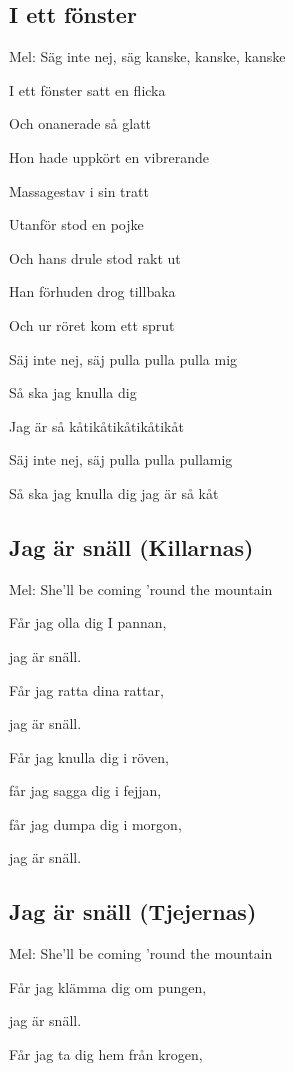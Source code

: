 \subsection{\textbf{I ett fönster}}

Mel: Säg inte nej, säg kanske, kanske, kanske\bigskip


I ett fönster satt en flicka

Och onanerade så glatt

Hon hade uppkört en vibrerande

Massagestav i sin tratt

Utanför stod en pojke

Och hans drule stod rakt ut

Han förhuden drog tillbaka

Och ur röret kom ett sprut

Säj inte nej, säj pulla pulla pulla mig

Så ska jag knulla dig

Jag är så kåtikåtikåtikåtikåt

Säj inte nej, säj pulla pulla pullamig

Så ska jag knulla dig jag är så kåt

\subsection{\textbf{Jag är snäll (Killarnas)}}

Mel: She’ll be coming ’round the mountain\bigskip

Får jag olla dig I pannan,

jag är snäll.

Får jag ratta dina rattar,

jag är snäll.

Får jag knulla dig i röven,

får jag sagga dig i fejjan,

får jag dumpa dig i morgon,

jag är snäll. 

\subsection{\textbf{Jag är snäll (Tjejernas) }}

Mel: She’ll be coming ’round the mountain\bigskip


Får jag klämma dig om pungen,

jag är snäll.

Får jag ta dig hem från krogen,

